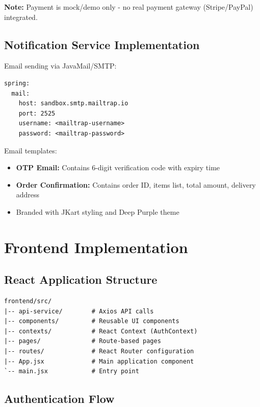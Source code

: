 \textbf{Note:} Payment is mock/demo only - no real payment gateway (Stripe/PayPal) integrated.

\subsection{Notification Service Implementation}

Email sending via JavaMail/SMTP:

\begin{verbatim}
spring:
  mail:
    host: sandbox.smtp.mailtrap.io
    port: 2525
    username: <mailtrap-username>
    password: <mailtrap-password>
\end{verbatim}

Email templates:
\begin{itemize}
    \item \textbf{OTP Email:} Contains 6-digit verification code with expiry time
    \item \textbf{Order Confirmation:} Contains order ID, items list, total amount, delivery address
    \item Branded with JKart styling and Deep Purple theme
\end{itemize}

\section{Frontend Implementation}

\subsection{React Application Structure}

\begin{verbatim}
frontend/src/
|-- api-service/        # Axios API calls
|-- components/         # Reusable UI components
|-- contexts/           # React Context (AuthContext)
|-- pages/              # Route-based pages
|-- routes/             # React Router configuration
|-- App.jsx             # Main application component
`-- main.jsx            # Entry point
\end{verbatim}

\subsection{Authentication Flow}

